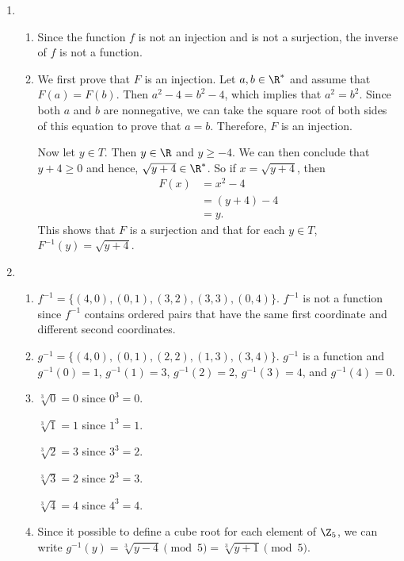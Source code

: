 \begin{enumerate}
\item \begin{enumerate}
\item Since the function $f$ is not an injection and is not a surjection, the inverse of 
$f$ is not a function.

\item We first prove that $F$ is an injection.  Let $a, b \in \R^*$ and assume that 
$F(a) = F(b)$.  Then $a^2 - 4 = b^2 - 4$, which implies that $a^2 = b^2$.  Since both $a$ and $b$ are nonnegative, we can take the square root of both sides of this equation to prove that $a = b$.  Therefore, $F$ is an injection.

Now let $y \in T$.  Then $y \in \R$ and $y \geq -4$.  We can then conclude that 
$y + 4 \geq 0$ and hence, $\sqrt{y + 4} \in \R^*$.  So if $x = \sqrt{y + 4}$, then
\begin{align*}
F(x) &= x^2 - 4 \\
     &= (y + 4) - 4 \\
     &= y.
\end{align*}
This shows that $F$ is a surjection and that for each $y \in T$, $F^{-1}(y) = \sqrt{y + 4}$.
\end{enumerate}



\item \begin{enumerate}
\item $f^{-1} = \{ (4, 0), (0, 1), (3, 2), (3, 3), (0, 4) \}$.  $f^{-1}$ is not a function since $f^{-1}$ contains ordered pairs that have the same first coordinate and different second coordinates.

\item $g^{-1} = \{ (4, 0), (0, 1), (2, 2), (1, 3), (3, 4) \}$.  $g^{-1}$ is a function and 
$g^{-1}(0) = 1$, $g^{-1}(1) = 3$, $g^{-1}(2) = 2$, $g^{-1}(3) = 4$, and $g^{-1}(4) = 0$.

\item \begin{multicols}{2}
$\sqrt[3]{0} = 0$ since $0^3 = 0$.

$\sqrt[3]{1} = 1$ since $1^3 = 1$.

$\sqrt[3]{2} = 3$ since $3^3 = 2$.

$\sqrt[3]{3} = 2$ since $2^3 = 3$.

$\sqrt[3]{4} = 4$ since $4^3 = 4$.
\end{multicols}

\item Since it possible to define a cube root for each element of $\Z_5$, we can write 
$g^{-1}(y) = \sqrt[3]{y - 4} \pmod 5 = \sqrt[3]{y + 1} \pmod 5$.
\end{enumerate}
\end{enumerate}
\hbreak

\endinput
